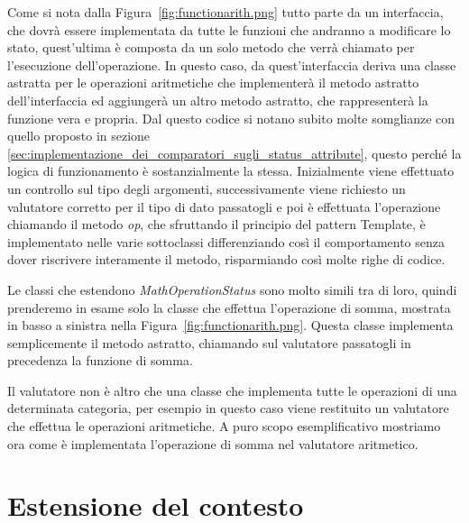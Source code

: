 Come si nota dalla Figura~\ref{fig:functionarith.png} tutto parte da un interfaccia, che dovrà essere implementata da tutte le funzioni che andranno a modificare lo stato, quest'ultima è composta da un solo metodo che verrà chiamato per l'esecuzione dell'operazione.
In questo caso, da quest'interfaccia deriva una classe astratta per le operazioni aritmetiche che implementerà il metodo astratto dell'interfaccia ed aggiungerà un altro metodo astratto, che rappresenterà la funzione vera e propria.
Dal questo codice si notano subito molte somglianze con quello proposto in sezione \ref{sec:implementazione_dei_comparatori_sugli_status_attribute}, questo perché la logica di funzionamento è sostanzialmente la stessa.
Inizialmente viene effettuato un controllo sul tipo degli argomenti, successivamente viene richiesto un valutatore corretto per il tipo di dato passatogli e poi è effettuata l'operazione chiamando il metodo \textit{op}, che sfruttando il principio del pattern Template, è implementato nelle varie sottoclassi differenziando così il comportamento senza dover riscrivere interamente il metodo, risparmiando così molte righe di codice.\\ \par
Le classi che estendono \textit{MathOperationStatus} sono molto simili tra di loro, quindi prenderemo in esame solo la classe che effettua l'operazione di somma, mostrata in basso a sinistra nella Figura~\ref{fig:functionarith.png}.
Questa classe implementa semplicemente il metodo astratto, chiamando sul valutatore passatogli in precedenza la funzione di somma.\\ \par
Il valutatore non è altro che una classe che implementa tutte le operazioni di una determinata categoria, per esempio in questo caso viene restituito un valutatore che effettua le operazioni aritmetiche.
A puro scopo esemplificativo mostriamo ora come è implementata l'operazione di somma nel valutatore aritmetico.

\section{Estensione del contesto} %
\label{sec:estensione_del_contesto}

